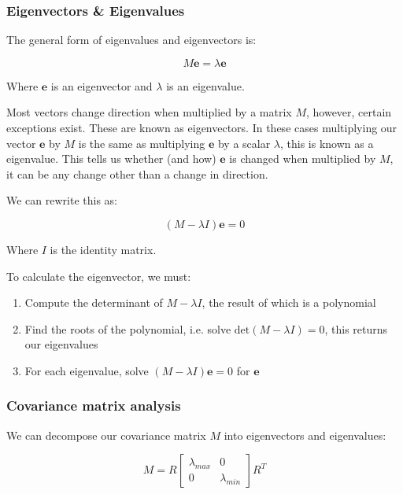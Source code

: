 \documentclass{article}
\begin{document}
\subsubsection{Eigenvectors \& Eigenvalues}

The general form of eigenvalues and eigenvectors is:

\[
  M \mathbf{e} = \lambda \mathbf{e}
\]

Where $\mathbf{e}$ is an eigenvector and $\lambda$ is an eigenvalue.

Most vectors change direction when multiplied by a matrix $M$, however, certain exceptions exist. These are known as eigenvectors. In these cases multiplying our vector $\mathbf{e} $ by $M$ is the same as multiplying $\mathbf{e} $ by a scalar $\lambda$, this is known as a eigenvalue. This tells us whether (and how) $\mathbf{e} $ is changed when multiplied by $M$, it can be any change other than a change in direction.


We can rewrite this as:

\[
  (M - \lambda I)\mathbf{e} = 0
\]

Where $I$ is the identity matrix.

To calculate the eigenvector, we must:

\begin{enumerate}
  \item Compute the determinant of $M-\lambda I$, the result of which is a polynomial
  \item Find the roots of the polynomial, i.e. solve $\text{det}(M-\lambda I) =0$, this returns our eigenvalues
  \item For each eigenvalue, solve $(M-\lambda I)\mathbf{e} = 0 $ for $\mathbf{e} $
\end{enumerate}



\subsubsection{Covariance matrix analysis}

We can decompose our covariance matrix $M$ into eigenvectors and eigenvalues:

\[
  M = R \begin{bmatrix}
    \lambda_{max} & 0 \\
    0 & \lambda_{min}
  \end{bmatrix}R^{T}
\]
\end{document}
